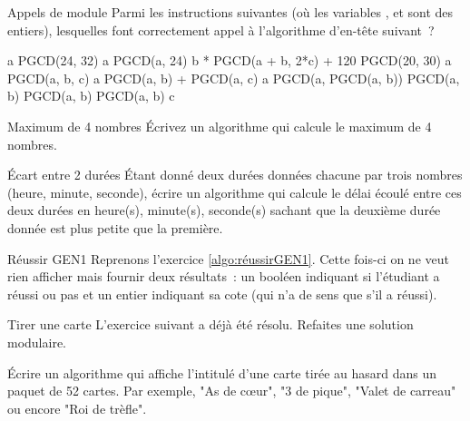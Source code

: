 	\begin{Exercice}{Appels de module}
		Parmi les instructions suivantes (où les variables
		,  et 
		sont des entiers), lesquelles font correctement appel 
		à l’algorithme d’en-tête suivant~?
	
		\begin{LDA}
		\end{LDA}
	
		\begin{LDA}
		\Stmt [1] a \Gets PGCD(24, 32)
		\Stmt [2] a \Gets PGCD(a, 24)
		\Stmt [3] b  * PGCD(a + b, 2*c) + 120
		\Stmt [4] PGCD(20, 30)
		\Stmt [5] a \Gets PGCD(a, b, c)
		\Stmt [6] a \Gets PGCD(a, b) + PGCD(a, c)
		\Stmt [7] a \Gets PGCD(a, PGCD(a, b))
		\Stmt [8] \Read PGCD(a, b)
		\Stmt [9] \Write PGCD(a, b)
		\Stmt [10] PGCD(a, b) \Gets c
		\end{LDA}
	\end{Exercice}
	
	\begin{Exercice}{Maximum de 4 nombres}
		Écrivez un algorithme qui calcule le maximum de 4 nombres.
	\end{Exercice}

	\begin{Exercice}{Écart entre 2 durées}
		Étant donné deux durées données chacune par trois
		nombres (heure, minute, seconde),
		écrire un algorithme qui calcule
		le délai écoulé entre ces deux durées en heure(s), minute(s),
		seconde(s) sachant que la deuxième durée donnée 
		est plus petite que la première.
	\end{Exercice}
	
	\begin{Exercice}{Réussir GEN1}
		Reprenons l’exercice \vref{algo:réussirGEN1}.
		Cette fois-ci on ne veut rien afficher
		mais fournir deux résultats~:
		un booléen indiquant si l’étudiant a réussi ou pas
		et un entier indiquant sa cote (qui n’a de sens que s’il a réussi). 
	\end{Exercice}

	\begin{Exercice}{Tirer une carte}
		L’exercice suivant a déjà été résolu. 
		Refaites une solution modulaire.
		
		Écrire un algorithme qui affiche l’intitulé d’une carte
		tirée au hasard dans un paquet de 52 cartes.
		Par exemple, "As de cœur", "3 de pique", "Valet de carreau"
		ou encore "Roi de trèfle".
	\end{Exercice}

